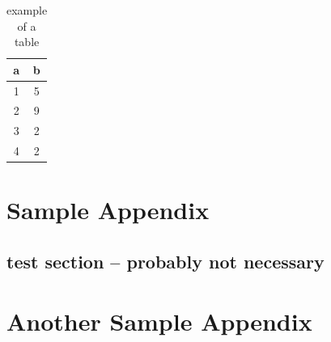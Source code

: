 \documentclass[oneside]{ritthesis}
\begin{document}
\begin{table}
\centering
\caption{example of a table}
\label{tab:samp}
\begin{tabular}{cc}
\hline
a		& b\\
\hline
1		& 5\\
2		& 9\\
3		& 2\\
4		& 2\\
\hline
\end{tabular}
\end{table}

\nocite{cheung,zhao,cao,zhang}
\nocite{*}




\appendix
\chapter{Sample Appendix}
\section{test section -- probably not necessary}
\lipsum[6-9]
\chapter{Another Sample Appendix}
\lipsum[10-11]
\end{document}
